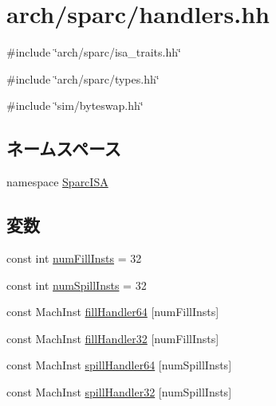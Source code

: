 \hypertarget{handlers_8hh}{
\section{arch/sparc/handlers.hh}
\label{handlers_8hh}
}
{\ttfamily \#include \char`\"{}arch/sparc/isa\_\-traits.hh\char`\"{}}\par
{\ttfamily \#include \char`\"{}arch/sparc/types.hh\char`\"{}}\par
{\ttfamily \#include \char`\"{}sim/byteswap.hh\char`\"{}}\par
\subsection*{ネームスペース}
\begin{DoxyCompactItemize}
\item 
namespace \hyperlink{namespaceSparcISA}{SparcISA}
\end{DoxyCompactItemize}
\subsection*{変数}
\begin{DoxyCompactItemize}
\item 
const int \hyperlink{namespaceSparcISA_a41cabe542f53b98458790511452d62ec}{numFillInsts} = 32
\item 
const int \hyperlink{namespaceSparcISA_a2e68c763f4f92cca75cbbbad7d0ee75f}{numSpillInsts} = 32
\item 
const MachInst \hyperlink{namespaceSparcISA_a85197bb01eb016d70239c26406fbfe6b}{fillHandler64} \mbox{[}numFillInsts\mbox{]}
\item 
const MachInst \hyperlink{namespaceSparcISA_aa06e86caff101a9cb8f31cb6aa23e982}{fillHandler32} \mbox{[}numFillInsts\mbox{]}
\item 
const MachInst \hyperlink{namespaceSparcISA_a2ac6be3d632ad25c90e12c201bf1d1d1}{spillHandler64} \mbox{[}numSpillInsts\mbox{]}
\item 
const MachInst \hyperlink{namespaceSparcISA_a37105350a4e231a7132e2b7e18c52ce0}{spillHandler32} \mbox{[}numSpillInsts\mbox{]}
\end{DoxyCompactItemize}
